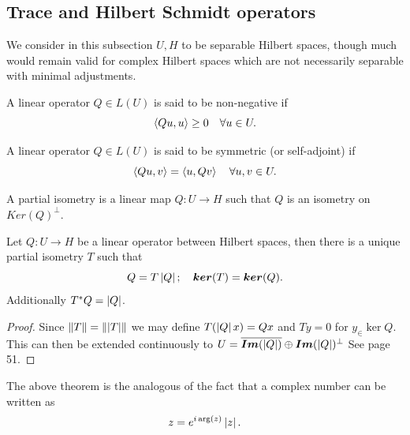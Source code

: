 \documentclass[
    a4paper,
    DIV=14,
    abstract=true,
    numbers=noenddot
]{scrartcl}
\begin{document}
\subsection{Trace and Hilbert Schmidt operators}
We consider in this subsection $U,H$ to be separable Hilbert spaces, though much would remain valid for complex Hilbert spaces which are not necessarily separable with minimal adjustments.
\begin{definition}
	A linear operator $Q\in L(U)$ is said to be non-negative if
	\begin{equation*}
		\left\langle Qu,u\right\rangle\geq 0\quad\forall u\in U.
	\end{equation*}
\end{definition}
\begin{definition}
	A linear operator $Q\in L(U)$ is said to be symmetric (or self-adjoint) if
	\begin{equation*}
		\left\langle Qu,v\right\rangle=\left\langle u,Qv\right\rangle\quad\forall u,v\in U.
	\end{equation*}
\end{definition}
\begin{definition}
	A partial isometry is a linear map $Q:U\to H$ such that $Q$ is an isometry on $Ker(Q)^\perp$.
\end{definition}
\begin{theorem}
	Let $Q:U\to H$ be a linear operator between Hilbert spaces, then there is a unique partial isometry $T$ such that
	\begin{equation*}
		Q=T\left| Q \right|;\quad \bm{ker}(T)=\bm{ker}(Q).
	\end{equation*}
	Additionally $T^*Q=\left| Q \right|$.
\end{theorem}
\begin{proof}
	Since $\left\lVert T \right\rVert=\left\lVert \left| T \right| \right\rVert$ we may define $T(\left| Q \right|x)=Qx$ and  $Ty=0$ for  $y_\in \ker{Q}$. This can then be extended continuously to $U=\overline{\bm{Im}(\left| Q \right|)}\oplus \bm{Im}(\left| Q \right|)^\perp$   See \cite{murphy2014c} page 51.
\end{proof}

The above theorem is the analogous of the fact that a complex number can be written as
\begin{equation*}
	z=e^{i\arg(z)}\left| z \right|.
\end{equation*}
\end{document}
